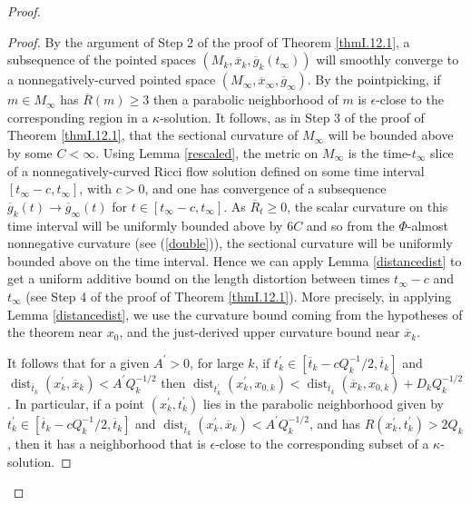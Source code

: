 \documentclass[12pt]{amsart}
\newcommand{\dist}{\operatorname{dist}}
\numberwithin{equation}{section}
\theoremstyle{plain}
\theoremstyle{definition}
\theoremstyle{remark}
\begin{document}
\begin{proof}
\begin{proof}
By the argument of Step 2 of the proof of Theorem \ref{thmI.12.1}, 
a subsequence of the
pointed spaces $(M_k, \overline{x}_k, \overline{g}_k({t}_\infty))$ 
will smoothly converge to a nonnegatively-curved pointed space $(M_\infty,
\overline{x}_\infty,\overline{g}_\infty)$. 
By the pointpicking, if $m \in M_\infty$ has $\overline{R}(m) \ge 3$ 
then a parabolic neighborhood of $m$ is $\epsilon$-close 
to the corresponding region in a $\kappa$-solution.
It follows,
as in Step 3 of the proof of Theorem
\ref{thmI.12.1}, that the sectional curvature of $M_\infty$ will be bounded above by
some $C < \infty$. Using Lemma \ref{rescaled}, the metric on 
$M_\infty$ is the time-$t_\infty$ slice of
a nonnegatively-curved Ricci flow solution defined on some time interval 
$[t_\infty - c , t_\infty]$, with $c > 0$, 
and one has convergence of a subsequence $\overline{g}_k(t)
\rightarrow \overline{g}_\infty(t)$ for $t \in [t_\infty - c , t_\infty]$.
As $\overline{R}_t \ge 0$, the scalar curvature on this time interval
will be uniformly bounded above by $6C$ and so from  the
$\Phi$-almost nonnegative curvature (see (\ref{double})), the
sectional curvature will be uniformly bounded above on the time interval.
Hence we can apply Lemma \ref{distancedist} to get a uniform additive bound on the 
length
distortion between times $t_\infty - c$ and $t_\infty$ (see Step 4 of the
proof of Theorem \ref{thmI.12.1}). More precisely, in applying Lemma 
\ref{distancedist}, we
use the curvature bound coming from the hypotheses of the theorem near 
$x_0$, and the just-derived upper curvature bound near $\overline{x}_k$.

It follows that for a given $A^\prime > 0$, for large
$k$, if $t_k^\prime \in [\overline{t}_k - c Q_k^{-1}/2, \overline{t}_k]$ and 
$\dist_{\overline{t}_k}(x_k^\prime, \overline{x}_k) < A^\prime Q_k^{-1/2}$ 
then $\dist_{t^\prime_k}(x^\prime_k, {x}_{0,k}) 
< \dist_{\overline{t}_k}(\overline{x}_k, 
x_{0,k}) +
D_k Q_k^{-1/2}$. In particular, if a point
$(x_k^\prime, t_k^\prime)$ lies in the
parabolic neighborhood given by
$t_k^\prime \in [\overline{t}_k - c Q_k^{-1}/2, \overline{t}_k]$ and 
$\dist_{\overline{t}_k}(x_k^\prime, \overline{x}_k) < A^\prime Q_k^{-1/2}$, 
and  has 
$R(x_k^\prime, t_k^\prime) > 2Q_k$, then it has a neighborhood that
is $\epsilon$-close to the corresponding subset of a $\kappa$-solution.


\end{proof}
\end{proof}
\end{document}
